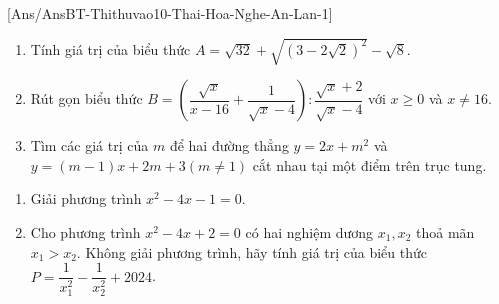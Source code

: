 \documentclass[FileMain.tex]{subfiles}
\begin{document}
%	
\setcounter{bt}{0}
\luuloigiaibt
{}[Ans/AnsBT-Thithuvao10-Thai-Hoa-Nghe-An-Lan-1]
\begin{bt}[2,5 điểm]
	\begin{enumerate}
		\item Tính giá trị của biểu thức $A=\sqrt{32}+\sqrt{(3-2\sqrt{2})^2}-\sqrt{8}$.
		\item Rút gọn biểu thức $B=\left(\dfrac{\sqrt{x}}{x-16}+\dfrac{1}{\sqrt{x}-4}\right): \dfrac{\sqrt{x}+2}{\sqrt{x}-4}$ với $x \geq 0$ và $x \neq 16$.
		\item Tìm các giá trị của $m$ để hai đường thẳng $y=2x+m^2$ và $y=(m-1) x+2m+3(m \neq 1)$ cắt nhau tại một điểm trên trục tung.
	\end{enumerate}
	\loigiai{}
\end{bt}

\begin{bt}[2,0 điểm]
	\begin{enumerate}
		\item Giải phương trình $x^2-4x-1=0$.
		\item Cho phương trình $x^2-4x+2=0$ có hai nghiệm dương $x_1, x_2$ thoả mãn $x_1 > x_2$. Không giải phương trình, hãy tính giá trị của biểu thức $P=\dfrac{1}{x_1^2}-\dfrac{1}{x_2^2}+2024$.
	\end{enumerate}
	\loigiai{}
\end{bt}
\end{document}
